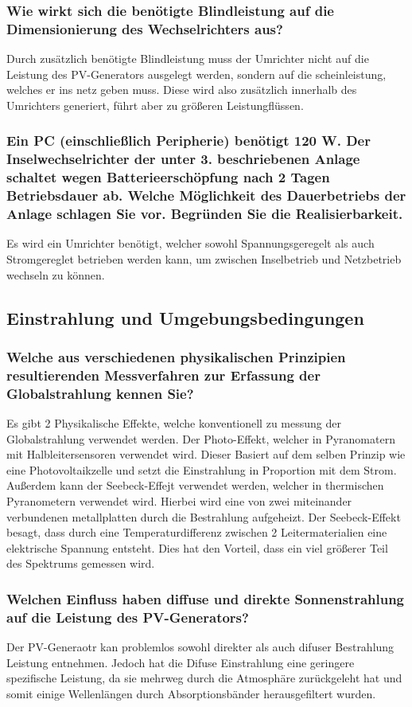 \subsubsection{Wie wirkt sich die benötigte Blindleistung auf die Dimensionierung des Wechselrichters aus?}
Durch zusätzlich benötigte Blindleistung muss der Umrichter nicht auf die Leistung des PV-Generators ausgelegt werden, sondern auf die scheinleistung, welches er ins netz geben muss.
Diese wird also zusätzlich innerhalb des Umrichters generiert, führt aber zu größeren Leistungflüssen.\cite{SMA_Q-Auslegung}
\subsubsection{Ein PC (einschließlich Peripherie) benötigt 120 W. Der Inselwechselrichter der unter 3. beschriebenen Anlage schaltet wegen Batterieerschöpfung nach 2 Tagen Betriebsdauer ab. Welche Möglichkeit des Dauerbetriebs der Anlage schlagen Sie vor. Begründen Sie die Realisierbarkeit.}
Es wird ein Umrichter benötigt, welcher sowohl Spannungsgeregelt als auch Stromgereglet betrieben werden kann, um zwischen Inselbetrieb und Netzbetrieb wechseln zu können.
\subsection{Einstrahlung und Umgebungsbedingungen}
\subsubsection{Welche aus verschiedenen physikalischen Prinzipien resultierenden Messverfahren zur Erfassung der Globalstrahlung kennen Sie?}
Es gibt 2 Physikalische Effekte, welche konventionell zu messung der Globalstrahlung verwendet werden. 
Der Photo-Effekt, welcher in Pyranomatern mit Halbleitersensoren verwendet wird. 
Dieser Basiert auf dem selben Prinzip wie eine Photovoltaikzelle und setzt die Einstrahlung in Proportion mit dem Strom.
Außerdem kann der Seebeck-Effejt verwendet werden, welcher in thermischen Pyranometern verwendet wird.
Hierbei wird eine von zwei miteinander verbundenen metallplatten durch die Bestrahlung aufgeheizt. 
Der Seebeck-Effekt besagt, dass durch eine Temperaturdifferenz zwischen 2 Leitermaterialien eine elektrische Spannung entsteht.\cite{Wiki-Seebeck}
Dies hat den Vorteil, dass ein viel größerer Teil des Spektrums gemessen wird.

\subsubsection{Welchen Einfluss haben diffuse und direkte Sonnenstrahlung auf die Leistung des PV-Generators?}
Der PV-Generaotr kan problemlos sowohl direkter als auch difuser Bestrahlung Leistung entnehmen. 
Jedoch hat die Difuse Einstrahlung eine geringere spezifische Leistung, da sie mehrweg durch die Atmosphäre zurückgeleht hat und somit einige Wellenlängen durch Absorptionsbänder herausgefiltert wurden.
